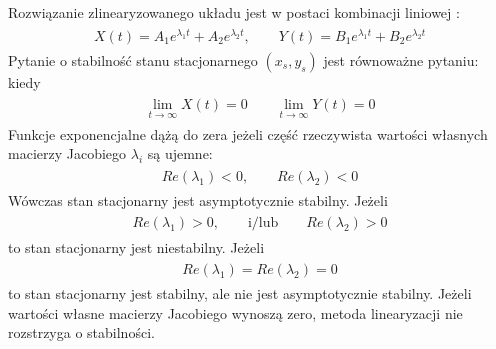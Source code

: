 \documentclass[a4paper,12pt,polish]{sphinxmanual}
\begin{document}
Rozwiązanie zlinearyzowanego układu jest w postaci kombinacji liniowej :
\label{ch1/chI023:equation-eqn41}\begin{gather}
\begin{split}X(t) = A_1  e^{\lambda_1 t} + A_2 e^{\lambda_2 t}, \quad \quad  Y(t) = B_1 e^{\lambda_1 t} +  B_2 e^{\lambda_2 t}\end{split}\label{ch1/chI023-eqn41}
\end{gather}
Pytanie o stabilność stanu stacjonarnego $(x_s, y_s)$ jest równoważne pytaniu: kiedy
\label{ch1/chI023:equation-eqn42}\begin{gather}
\begin{split}\lim_{t\to \infty} X(t) = 0  \quad \quad \lim_{t\to \infty} Y(t) = 0\end{split}\label{ch1/chI023-eqn42}
\end{gather}
Funkcje exponencjalne dążą do zera jeżeli część rzeczywista  wartości własnych macierzy Jacobiego $\lambda_i$ są  ujemne:
\label{ch1/chI023:equation-eqn43}\begin{gather}
\begin{split} Re(\lambda_1) < 0, \quad \quad Re(\lambda_2) < 0\end{split}\label{ch1/chI023-eqn43}
\end{gather}
Wówczas stan stacjonarny jest asymptotycznie stabilny. Jeżeli
\label{ch1/chI023:equation-eqn44}\begin{gather}
\begin{split} Re(\lambda_1) > 0, \quad \quad \mbox{i/lub} \quad \quad Re(\lambda_2) >  0\end{split}\label{ch1/chI023-eqn44}
\end{gather}
to stan stacjonarny jest niestabilny. Jeżeli
\label{ch1/chI023:equation-eqn45}\begin{gather}
\begin{split} Re(\lambda_1) = Re(\lambda_2) =  0\end{split}\label{ch1/chI023-eqn45}
\end{gather}
to stan stacjonarny jest stabilny, ale nie  jest asymptotycznie stabilny. Jeżeli wartości własne macierzy Jacobiego wynoszą zero, metoda linearyzacji nie rozstrzyga o stabilności.
\end{document}
